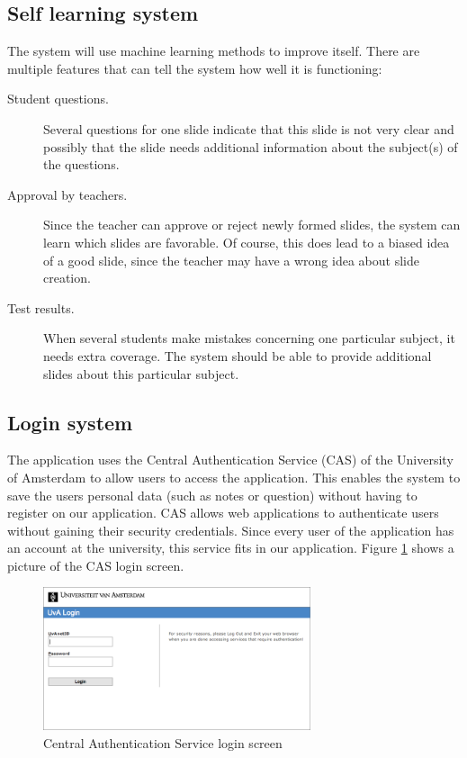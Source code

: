 \documentclass[11pt]{article}
\begin{document}
\subsection{Self learning system}
The system will use machine learning methods to improve itself. There are multiple features that can tell the system how well it is functioning:
\begin{description}
\item[Student questions.] Several questions for one slide indicate that this slide is not very clear and possibly that the slide needs additional information about the subject(s) of the questions. 
\item[Approval by teachers.] Since the teacher can approve or reject newly formed slides, the system can learn which slides are favorable. Of course, this does lead to a biased idea of a good slide, since the teacher may have a wrong idea about slide creation. 
\item[Test results.] When several students make mistakes concerning one particular subject, it needs extra coverage. The system should be able to provide additional slides about this particular subject.
\end{description}

\subsection{Login system}
The application uses the Central Authentication Service (CAS) of the University of Amsterdam to allow users to access the application. This enables the system to save the users personal data (such as notes or question) without having to register on our application. CAS allows web applications to authenticate users without gaining their security credentials. Since every user of the application has an account at the university, this service fits in our application. Figure \ref{CAS} shows a picture of the CAS login screen.
\begin{figure}[!h]
\centering
\includegraphics[width=0.7\textwidth]{Cas.png}
\caption{Central Authentication Service login screen}
\label{CAS}
\end{figure}
\end{document}
